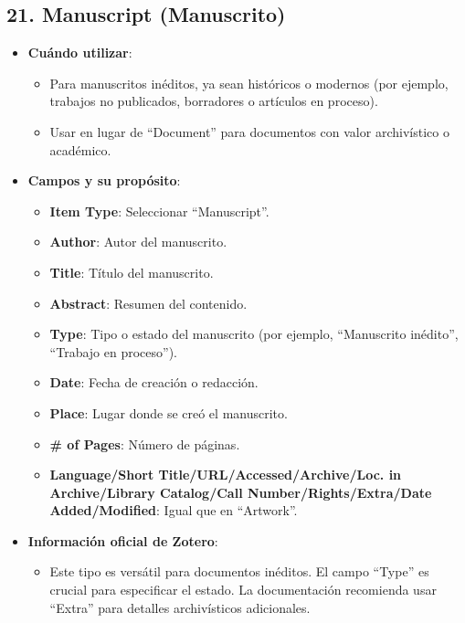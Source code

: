 \documentclass[
  jou,
  floatsintext,
  longtable,
  a4paper,
  nolmodern,
  notxfonts,
  notimes,
  colorlinks=true,linkcolor=blue,citecolor=blue,urlcolor=blue]{apa7}
\providecommand{\tightlist}{%
  \setlength{\itemsep}{0pt}\setlength{\parskip}{0pt}}
\begin{document}
\subsection{21. Manuscript (Manuscrito)}\label{manuscript-manuscrito}

\begin{itemize}
\tightlist
\item
  \textbf{Cuándo utilizar}:

  \begin{itemize}
  \tightlist
  \item
    Para manuscritos inéditos, ya sean históricos o modernos (por
    ejemplo, trabajos no publicados, borradores o artículos en proceso).
  \item
    Usar en lugar de ``Document'' para documentos con valor archivístico
    o académico.
  \end{itemize}
\item
  \textbf{Campos y su propósito}:

  \begin{itemize}
  \tightlist
  \item
    \textbf{Item Type}: Seleccionar ``Manuscript''.
  \item
    \textbf{Author}: Autor del manuscrito.
  \item
    \textbf{Title}: Título del manuscrito.
  \item
    \textbf{Abstract}: Resumen del contenido.
  \item
    \textbf{Type}: Tipo o estado del manuscrito (por ejemplo,
    ``Manuscrito inédito'', ``Trabajo en proceso'').
  \item
    \textbf{Date}: Fecha de creación o redacción.
  \item
    \textbf{Place}: Lugar donde se creó el manuscrito.
  \item
    \textbf{\# of Pages}: Número de páginas.
  \item
    \textbf{Language/Short Title/URL/Accessed/Archive/Loc. in
    Archive/Library Catalog/Call Number/Rights/Extra/Date
    Added/Modified}: Igual que en ``Artwork''.
  \end{itemize}
\item
  \textbf{Información oficial de Zotero}:

  \begin{itemize}
  \tightlist
  \item
    Este tipo es versátil para documentos inéditos. El campo ``Type'' es
    crucial para especificar el estado. La documentación recomienda usar
    ``Extra'' para detalles archivísticos adicionales.
  \end{itemize}
\end{itemize}
\end{document}
